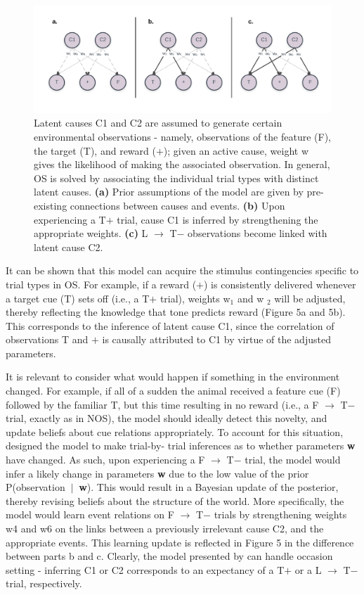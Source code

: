 \documentclass[11pt]{article}
\newcommand{\bsf}[1]{\textbf{#1}}
\newcommand\given[1][]{\:#1\vert\:} %
\let\citeN=\citet
\begin{document}
\begin{figure}[h]
\centering
\includegraphics[width=\textwidth]{Figures/Fig5}
\caption{Latent causes C1 and C2 are assumed to generate certain environmental 
observations - namely, observations of the feature (F), the target (T), and 
reward ($+$); given an active cause, weight w gives the likelihood of making the 
associated observation. In general, OS is solved by associating the individual 
trial types with distinct latent causes. \bsf{(a)} Prior assumptions of the 
model are given by pre-existing connections between causes and events. \bsf{(b)} 
Upon experiencing a T$+$ trial, cause C1 is inferred by strengthening the 
appropriate weights. \bsf{(c)} L $\rightarrow$ T$-$ observations become linked 
with latent cause C2.}
\label{fig:latentCause}
\end{figure} 

It can be shown that this model can acquire the stimulus contingencies specific 
to trial types in OS. For example, if a reward ($+$) is consistently delivered 
whenever a target cue (T) sets off (i.e., a T$+$ trial), weights w$_{1}$ and w
$_{2}$ will be adjusted, thereby reflecting the knowledge that tone predicts 
reward (Figure 5a and 5b). This corresponds to the inference of latent cause 
C1, since the correlation of observations T and $+$ is causally attributed to 
C1 by virtue of the adjusted parameters.

It is relevant to consider what would happen if something in the environment 
changed. For example, if all of a sudden the animal received a feature cue (F) 
followed by the familiar T, but this time resulting in no reward (i.e., a F $
\rightarrow$ T$-$ trial, exactly as in NOS), the model should ideally detect 
this novelty, and update beliefs about cue relations appropriately. To account 
for this situation, \citeN{Courville2006} designed the model to make trial-by-
trial inferences as to whether parameters \textbf{w} have changed. As such, 
upon experiencing a F $\rightarrow$ T$-$ trial, the model would infer a likely 
change in parameters \textbf{w} due to the low value of the prior P(observation 
$\given$ \textbf{w}). This would result in a Bayesian update of the posterior, 
thereby revising beliefs about the structure of the world. More specifically, 
the model would learn event relations on F $\rightarrow$ T$-$ trials by 
strengthening weights w4 and w6 on the links between a previously irrelevant 
cause C2, and the appropriate events. This learning update is reflected in 
Figure 5 in the difference between parts b and c. Clearly, the model presented 
by \citeN{Courville2006} can handle occasion setting - inferring C1 or C2 
corresponds to an expectancy of a T$+$ or a L $\rightarrow$ T$-$ trial, 
respectively.
\end{document}
